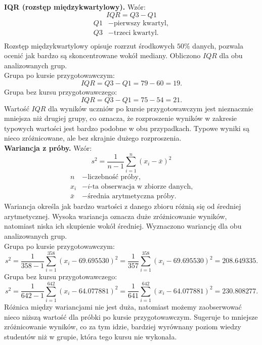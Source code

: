 \documentclass[12pt, a4paper]{article}
\begin{document}
	
	\textbf{IQR (rozstęp międzykwartylowy).} Wzór:
	\[IQR=Q3-Q1\]
	\[
	\begin{aligned}
		Q1 &- \text{pierwszy kwartyl},\\
		Q3 &- \text{trzeci kwartyl}.\\
	\end{aligned}
	\]
	Rozstęp międzykwartylowy opisuje rozrzut środkowych $50\%$ danych, pozwala ocenić jak bardzo są skoncentrowane wokół mediany. Obliczono $IQR$ dla obu analizowanych grup.\\
	Grupa po kursie przygotowawczym:\\
	\[IQR=Q3-Q1=79-60=19.\]
	Grupa bez kursu przygotowawczego:\\
	\[IQR=Q3-Q1=75-54=21.\]
	Wartość $IQR$ dla wyników uczniów po kursie przygotowawczym jest nieznacznie mniejsza niż drugiej grupy, co oznacza, że rozproszenie wyników w zakresie typowych wartości jest bardzo podobne w obu przypadkach. Typowe wyniki są nieco zróżnicowane, ale bez skrajnie dużego rozproszenia. \\
	
	
	
	\textbf{Wariancja z próby.} Wzór:
	\[s^2 = \frac{1}{n-1}\sum_{i=1}^{n}(x_i - \bar{x})^2 \]
	\[
	\begin{aligned}
		n &- \text{liczebność próby,} \\
		x_i &- \text{$i$-ta obserwacja w zbiorze danych,} \\
		\bar{x} &- \text{średnia arytmetyczna próby.}
	\end{aligned}
	\]
	Wariancja określa jak bardzo wartości z danego zbioru różnią się od średniej arytmetycznej. Wysoka wariancja oznacza duże zróżnicowanie wyników, natomiast niska ich skupienie wokół średniej. Wyznaczono wariancję dla obu analizowanych grup.\\
	Grupa po kursie przygotowawczym:\\
	\[s^2 = \frac{1}{358-1}\sum_{i=1}^{358}(x_i - 69.695530)^2= \frac{1}{357}\sum_{i=1}^{358}(x_i - 69.695530)^2=208.649335.\]
	Grupa bez kursu przygotowawczego:\\
	\[s^2 = \frac{1}{642-1}\sum_{i=1}^{642}(x_i - 64.077881)^2= \frac{1}{641}\sum_{i=1}^{642}(x_i - 64.077881)^2=230.808277.\]
	Różnica między wariancjami nie jest duża, natomiast możemy zaobserwować nieco niższą wartość dla próbki po kursie przygotowawczym. Sugeruje to mniejsze zróżnicowanie wyników, co za tym idzie, bardziej wyrównany poziom wiedzy studentów niż w grupie, która tego kursu nie wykonała.\\ 
	
\end{document}
